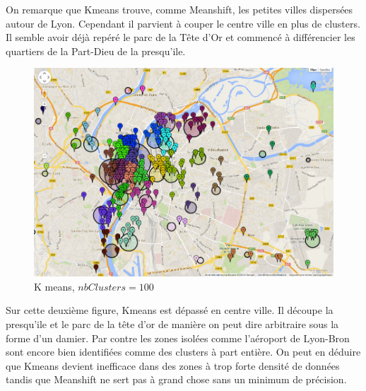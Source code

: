 On remarque que Kmeans trouve, comme Meanshift, les petites villes dispersées autour de Lyon. Cependant il parvient à couper le centre ville en plus de clusters. Il semble avoir déjà repéré le parc de la Tête d'Or et commencé à différencier les quartiers de la Part-Dieu de la presqu'ile.
\\

\begin{figure}[!h]
    \centering
    \includegraphics[width=16cm]{images/Kmeans2.png}
    \caption{K means, $nbClusters = 100$}
    \label{fig:Kmeans}
\end{figure}

Sur cette deuxième figure, Kmeans est dépassé en centre ville. Il découpe la presqu'ile et le parc de la tête d'or de manière on peut dire arbitraire sous la forme d'un damier.
Par contre les zones isolées comme l'aéroport de Lyon-Bron sont encore bien identifiées comme des clusters à part entière.
On peut en déduire que Kmeans devient inefficace dans des zones à trop forte densité de données tandis que Meanshift ne sert pas à grand chose sans un minimum de précision.
